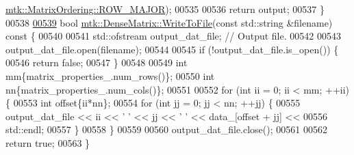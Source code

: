 \begin{DoxyCode}
      \hyperlink{namespacemtk_ga622801bd9f912d0f976c3e383f5f581ca21541962976d7709c26e9cd8385bd648}{mtk::MatrixOrdering::ROW\_MAJOR});
00535 
00536   \textcolor{keywordflow}{return} output;
00537 \}
00538 
\hypertarget{mtk__dense__matrix_8cc_source_l00539}{}\hyperlink{classmtk_1_1DenseMatrix_ab396804fb5f188e1eaa8578c738c59fc}{00539} \textcolor{keywordtype}{bool} \hyperlink{classmtk_1_1DenseMatrix_ab396804fb5f188e1eaa8578c738c59fc}{mtk::DenseMatrix::WriteToFile}(\textcolor{keyword}{const} std::string &filename)\textcolor{keyword}{ const }\{
00540 
00541   std::ofstream output\_dat\_file;  \textcolor{comment}{// Output file.}
00542 
00543   output\_dat\_file.open(filename);
00544 
00545   \textcolor{keywordflow}{if} (!output\_dat\_file.is\_open()) \{
00546     \textcolor{keywordflow}{return} \textcolor{keyword}{false};
00547   \}
00548 
00549   \textcolor{keywordtype}{int} mm\{matrix\_properties\_.num\_rows()\};
00550   \textcolor{keywordtype}{int} nn\{matrix\_properties\_.num\_cols()\};
00551 
00552   \textcolor{keywordflow}{for} (\textcolor{keywordtype}{int} ii = 0; ii < mm; ++ii) \{
00553     \textcolor{keywordtype}{int} offset\{ii*nn\};
00554     \textcolor{keywordflow}{for} (\textcolor{keywordtype}{int} jj = 0; jj < nn; ++jj) \{
00555       output\_dat\_file << ii << \textcolor{charliteral}{' '} << jj << \textcolor{charliteral}{' '} << data\_[offset + jj] <<
00556         std::endl;
00557     \}
00558   \}
00559 
00560   output\_dat\_file.close();
00561 
00562   \textcolor{keywordflow}{return} \textcolor{keyword}{true};
00563 \}
\end{DoxyCode}
